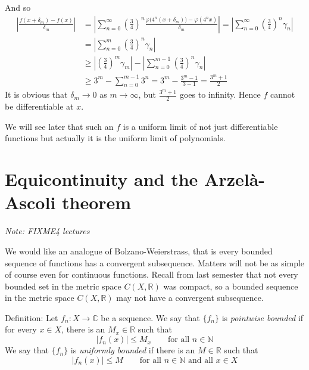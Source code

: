 \documentclass[12pt]{book}
\newcommand{\abs}[1]{\left\lvert {#1} \right\rvert}
\newcommand{\C}{{\mathbb{C}}}
\newcommand{\R}{{\mathbb{R}}}
\newcommand{\N}{{\mathbb{N}}}
\newcommand{\sectionnotes}[1]{\noindent \emph{Note: #1} \medskip \par}
\newcommand{\sectionnewpage}{\clearpage}
\theoremstyle{plain}
\theoremstyle{remark}
\theoremstyle{definition}
\theoremstyle{exercise}
\theoremstyle{example}
\begin{document}
And so
\begin{equation*}
\begin{split}
\abs{
\frac{f(x+\delta_m)-f(x)}{\delta_m}
}
& =
\abs{
\sum_{n=0}^\infty 
{\left(\frac{3}{4}\right)}^n
\frac{\varphi\bigl(4^n(x+\delta_m)\bigr)-\varphi(4^nx)}{\delta_m}
}
=
\abs{
\sum_{n=0}^\infty 
{\left(\frac{3}{4}\right)}^n
\gamma_n
}
\\
& =
\abs{
\sum_{n=0}^m 
{\left(\frac{3}{4}\right)}^n
\gamma_n
}
\\
& \geq
\abs{
{\left(\frac{3}{4}\right)}^m
\gamma_m}
-
\abs{
\sum_{n=0}^{m-1} 
{\left(\frac{3}{4}\right)}^n
\gamma_n
}
\\
& \geq
3^m
-
\sum_{n=0}^{m-1} 
3^n
=
3^m
-
\frac{3^{m}-1}{3-1}
=
\frac{3^m +1}{2}
\end{split}
\end{equation*}
It is obvious that $\delta_m \to 0$ as $m \to \infty$, but $\frac{3^m+1}{2}$
goes to infinity.  Hence $f$ cannot be differentiable at $x$.

We will see later that such an $f$ is a uniform limit of not just
differentiable functions but actually it is the uniform limit of
polynomials.

\medskip


\sectionnewpage
\section{Equicontinuity and the Arzel{\` a}-Ascoli theorem}
\label{sec:FIXME}

\sectionnotes{FIXME4 lectures}

\medskip

We would like an analogue of Bolzano-Weierstrass, that is every bounded
sequence of functions has a convergent subsequence.  Matters will not
be as simple of course even for continuous functions.  Recall from last
semester that not every bounded set in the metric space $C(X,\R)$ was compact,
so a bounded sequence in the metric space $C(X,\R)$ may not have a
convergent subsequence.

\medskip

Definition:
Let $f_n \colon X \to \C$ be a sequence.  We say that
$\{ f_n \}$
is \emph{pointwise bounded} if for every $x \in X$, there is an $M_x \in \R$
such that
$$
\abs{f_n(x)} \leq M_x \qquad \text{for all $n \in \N$}
$$
We say that
$\{ f_n \}$
is \emph{uniformly bounded} if there is an $M \in \R$
such that
$$
\abs{f_n(x)} \leq M \qquad \text{for all $n \in \N$ and all $x \in X$}
$$
\end{document}
